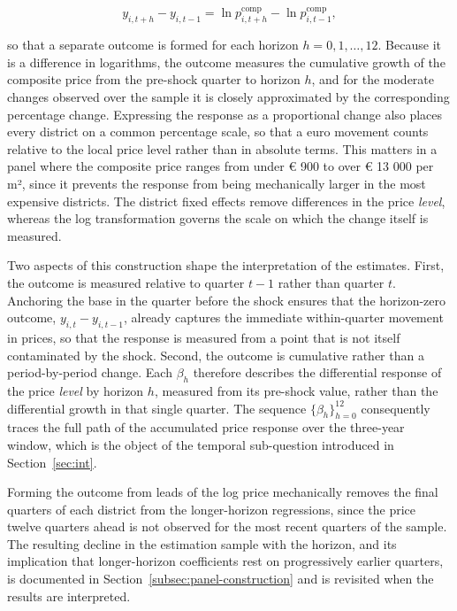 \documentclass[a4paper,12pt, headsepline]{scrartcl}
\numberwithin{equation}{section}
\begin{document}
\begin{equation}
	y_{i,t+h} - y_{i,t-1} = \ln p^{\text{comp}}_{i,t+h} - \ln p^{\text{comp}}_{i,t-1}, \label{eq:outcome}
\end{equation}

so that a separate outcome is formed for each horizon $h = 0, 1, \ldots, 12$. Because it is a difference in logarithms, the outcome measures the cumulative growth of the composite price from the pre-shock quarter to horizon $h$, and for the moderate changes observed over the sample it is closely approximated by the corresponding percentage change. Expressing the response as a proportional change also places every district on a common percentage scale, so that a euro movement counts relative to the local price level rather than in absolute terms. This matters in a panel where the composite price ranges from under € 900 to over € 13 000 per m², since it prevents the response from being mechanically larger in the most expensive districts. The district fixed effects remove differences in the price \emph{level}, whereas the log transformation governs the scale on which the change itself is measured.

Two aspects of this construction shape the interpretation of the estimates. First, the outcome is measured relative to quarter $t-1$ rather than quarter $t$. Anchoring the base in the quarter before the shock ensures that the horizon-zero outcome, $y_{i,t} - y_{i,t-1}$, already captures the immediate within-quarter movement in prices, so that the response is measured from a point that is not itself contaminated by the shock. Second, the outcome is cumulative rather than a period-by-period change. Each $\beta_h$ therefore describes the differential response of the price \emph{level} by horizon $h$, measured from its pre-shock value, rather than the differential growth in that single quarter. The sequence $\{\beta_h\}_{h=0}^{12}$ consequently traces the full path of the accumulated price response over the three-year window, which is the object of the temporal sub-question introduced in Section~\ref{sec:int}.

Forming the outcome from leads of the log price mechanically removes the final quarters of each district from the longer-horizon regressions, since the price twelve quarters ahead is not observed for the most recent quarters of the sample. The resulting decline in the estimation sample with the horizon, and its implication that longer-horizon coefficients rest on progressively earlier quarters, is documented in Section~\ref{subsec:panel-construction} and is revisited when the results are interpreted.
\end{document}
